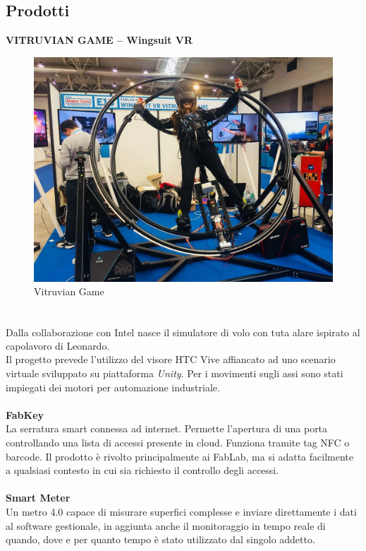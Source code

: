 \subsection{Prodotti}
\textbf{VITRUVIAN GAME – Wingsuit VR}\\
\begin{figure}[h]
\begin{center}
	\includegraphics[scale=0.2]{immagini/vitruvian.jpg}
	\caption{Vitruvian Game}
\end{center}
\end{figure}
\\
Dalla collaborazione con Intel\textsuperscript{\textregistered} nasce il simulatore di volo con tuta alare ispirato al capolavoro di Leonardo.\\
Il progetto prevede l'utilizzo del visore HTC Vive affiancato ad uno scenario virtuale sviluppato su piattaforma \textit{Unity}. Per i movimenti sugli assi sono stati impiegati dei motori per automazione industriale.
\\
\\
\textbf{FabKey}
\\
La serratura smart connessa ad internet. Permette l'apertura di una porta controllando una lista di accessi presente in cloud. Funziona tramite tag \gls{NFC} o barcode. Il prodotto è rivolto principalmente ai \gls{FabLab}, ma si adatta facilmente a qualsiasi contesto in cui sia richiesto il controllo degli accessi.
\\
\\
\textbf{Smart Meter}
\\
Un metro 4.0 capace di misurare superfici complesse e inviare direttamente i dati al software gestionale, in aggiunta anche il monitoraggio in tempo reale di quando, dove e per quanto tempo è stato utilizzato dal singolo addetto.


